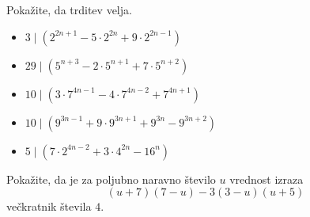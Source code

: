         
            \begin{naloga}
                Pokažite, da trditev velja.
                \begin{itemize}
                    \item $3\mid \left(2^{2n+1}-5\cdot 2^{2n}+9\cdot 2^{2n-1}\right)$ 
                    \item $29\mid \left(5^{n+3}-2\cdot 5^{n+1}+7\cdot 5^{n+2}\right)$ 
                    \item $10\mid \left(3\cdot 7^{4n-1}-4\cdot 7^{4n-2}+7^{4n+1}\right)$ 
                    \item $10\mid \left(9^{3n-1}+9\cdot 9^{3n+1}+9^{3n}-9^{3n+2}\right)$ 
                    \item $5\mid \left(7\cdot 2^{4n-2}+3\cdot 4^{2n}-16^n\right)$ 
                \end{itemize}
            \end{naloga}        


        
            \begin{naloga}
                Pokažite, da je za poljubno naravno število $u$ vrednost izraza $$(u+7)(7-u)-3(3-u)(u+5)$$ večkratnik števila $4$.
            \end{naloga}        
